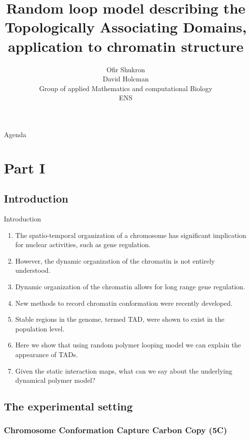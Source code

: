 \documentclass[8pt]{beamer}
\title{Random loop model describing the Topologically Associating Domains, application to chromatin structure}
\author{Ofir Shukron\\
David Holcman\\
Group of applied Mathematics and computational Biology\\
ENS}
\begin{document}
\begin{frame} %
\titlepage
\end{frame}

\begin{frame}{Agenda}
\tableofcontents
\end{frame}
\section{ Part I}

\subsection{Introduction}\label{subsection_introduction}

\begin{frame}{Introduction}
\begin{enumerate}
\item The spatio-temporal organization of a chromosome has significant implication for nuclear activities, such as gene regulation. 
\item However, the dynamic organization of the chromatin is not entirely understood.
\item Dynamic organization of the chromatin allows for long range gene regulation.
\item New methods to record chromatin conformation were recently developed. 
\item Stable regions in the genome, termed TAD, were shown to exist in the population level. 
\item Here we show that using random polymer looping model we can explain the appearance of TADs.
\item Given the static interaction maps, what can we say about the underlying dynamical polymer model?
\end{enumerate}
\end{frame}

\subsection{The experimental setting}\label{subsection_theExperimentalSetting}

\subsubsection{Chromosome Conformation Capture Carbon Copy (5C)}\label{subsubsection_chromosomeConformationCaptureExperiments}
\end{document}
